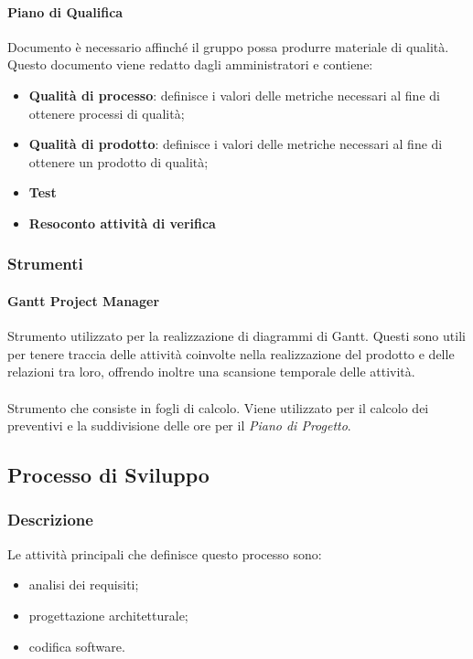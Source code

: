 		\paragraph{Piano di Qualifica}  \hfill \break
		Documento è necessario affinché il gruppo possa produrre materiale di qualità. \\
    Questo documento viene redatto dagli amministratori e contiene:
		\begin{itemize}
			\item \textbf{Qualità di processo}: definisce i valori delle metriche necessari al fine di ottenere processi di qualità;
			\item \textbf{Qualità di prodotto}: definisce i valori delle metriche necessari al fine di ottenere un prodotto di qualità;
			\item \textbf{Test}
			\item \textbf{Resoconto attività di verifica}
		\end{itemize}
		
	\subsubsection{Strumenti}
		\paragraph{Gantt Project Manager} \hfill \break
		Strumento utilizzato per la realizzazione di diagrammi di Gantt. Questi sono utili per tenere traccia 
    delle attività coinvolte nella realizzazione del prodotto e delle relazioni
		tra loro, offrendo inoltre una scansione temporale delle attività.
    \paragraph{  } \hfill \break
    Strumento che consiste in fogli di calcolo. Viene utilizzato per il calcolo dei preventivi e la suddivisione delle ore per il \textit{Piano di Progetto}.
	
\subsection{Processo di Sviluppo}
	\subsubsection{Descrizione}
	Le attività principali che definisce questo processo sono:
  \begin{itemize}
    \item analisi dei requisiti;
    \item progettazione architetturale;
    \item codifica software.
  \end{itemize}
		
